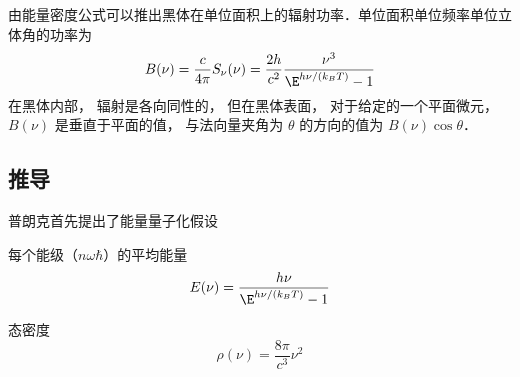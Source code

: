 由能量密度公式可以推出黑体在单位面积上的辐射功率．单位面积单位频率单位立体角的功率为
\begin{equation}\label{BBdLaw_eq2}
B(\nu) = \frac{c}{4\pi}S_\nu(\nu) = \frac{2h}{c^2} \frac{\nu^3}{\E^{h\nu/(k_B T)} - 1}
\end{equation}
在黑体内部， 辐射是各向同性的， 但在黑体表面， 对于给定的一个平面微元， $B(\nu)$ 是垂直于平面的值， 与法向量夹角为 $\theta$ 的方向的值为 $B(\nu)\cos\theta$．

\subsection{推导}
普朗克首先提出了能量量子化假设


每个能级（$n\omega\hbar$）的平均能量
\begin{equation}
E(\nu) = \frac{h\nu}{\E^{h\nu/(k_B T)} - 1}
\end{equation}

态密度
\begin{equation}
\rho(\nu) = \frac{8\pi}{c^3}\nu^2
\end{equation}
